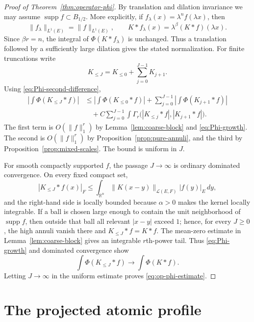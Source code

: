 \documentclass[10pt,a4paper]{amsart}
\numberwithin{equation}{section}
\newcommand{\R}{\mathbb R}
\newcommand{\cL}{\mathcal L}
\newcommand{\supp}{\operatorname{supp}}
\newcommand{\norm}[1]{\lVert #1\rVert}
\begin{document}
\begin{proof}[Proof of Theorem~\ref{thm:operator-phi}]
By translation and dilation invariance we may assume
$\supp f\subset B_{1/2}$.  More explicitly, if
$f_\lambda(x)=\lambda^n f(\lambda x)$, then
\[
 \norm{f_\lambda}_{L^1(E)}=\norm f_{L^1(E)},\qquad
 K*f_\lambda(x)=\lambda^\beta(K*f)(\lambda x).
\]
Since $\beta r=n$, the integral of $\Phi(K*f_\lambda)$ is unchanged.  Thus a
translation followed by a sufficiently large dilation gives the stated
normalization.  For finite truncations write
\[
 K_{\le J}=K_{\le0}+\sum_{j=0}^{J-1}K_{j+1}.
\]
Using \eqref{eq:Phi-second-difference},
\begin{align*}
 \left|\int\Phi(K_{\le J}*f)\right|
 &\le \left|\int\Phi(K_{\le0}*f)\right|
   +\sum_{j=0}^{J-1}\left|\int\Phi(K_{j+1}*f)\right|\\
 &\quad
   +C\sum_{j=0}^{J-1}\int
   \Gamma_r\bigl(|K_{\le j}*f|,|K_{j+1}*f|\bigr).
\end{align*}
The first term is $O(\norm f_1^r)$ by
Lemma~\ref{lem:coarse-block} and \eqref{eq:Phi-growth}.  The second is
$O(\norm f_1^r)$ by Proposition~\ref{prop:pure-annuli}, and the third by
Proposition~\ref{prop:mixed-scales}.  The bound is uniform in $J$.

For smooth compactly supported $f$, the passage $J\to\infty$ is ordinary
dominated convergence.  On every fixed compact set,
\[
 |K_{\le J}*f(x)|_F
 \le \int_{\R^n}\norm{K(x-y)}_{\cL(E,F)}|f(y)|_E\,dy,
\]
and the right-hand side is locally bounded because $\alpha>0$ makes the
kernel locally integrable.  If a ball is chosen large enough to contain the
unit neighborhood of $\supp f$, then outside that ball all relevant
$|x-y|$ exceed $1$; hence, for every $J\ge0$, the high annuli vanish there and
$K_{\le J}*f=K*f$.  The mean-zero estimate in
Lemma~\ref{lem:coarse-block} gives an integrable $r$th-power tail.  Thus
\eqref{eq:Phi-growth} and dominated convergence show
\[
 \int\Phi(K_{\le J}*f)\longrightarrow\int\Phi(K*f).
\]
Letting $J\to\infty$ in the uniform estimate proves
\eqref{eq:op-phi-estimate}.
\end{proof}




\section{The projected atomic profile}\label{sec:profile}
\end{document}
